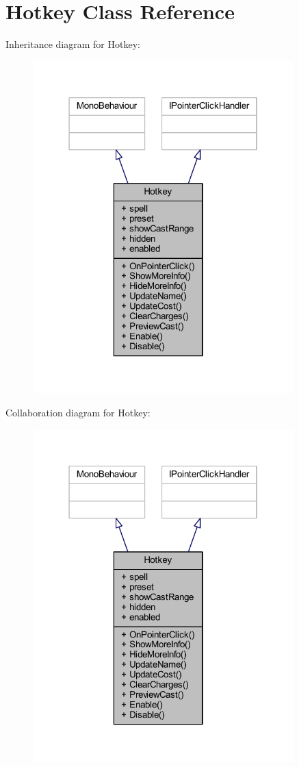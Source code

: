 \hypertarget{class_hotkey}{}\section{Hotkey Class Reference}
\label{class_hotkey}


Inheritance diagram for Hotkey\+:
\nopagebreak
\begin{figure}[H]
\begin{center}
\leavevmode
\includegraphics[width=286pt]{class_hotkey__inherit__graph}
\end{center}
\end{figure}


Collaboration diagram for Hotkey\+:
\nopagebreak
\begin{figure}[H]
\begin{center}
\leavevmode
\includegraphics[width=286pt]{class_hotkey__coll__graph}
\end{center}
\end{figure}
